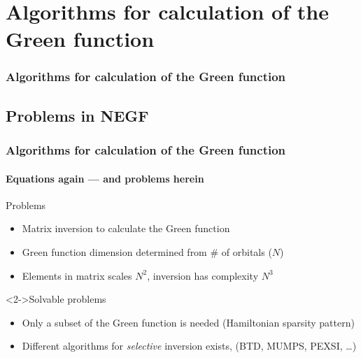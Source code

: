 \section{Algorithms for calculation of the Green function}

\begin{framenologo}
  \frametitle{Algorithms for calculation of the Green function}
  \tableofcontents[currentsection]
\end{framenologo}


\subsection{Problems in NEGF}

\begin{framenologo}
  \frametitle{Algorithms for calculation of the Green function}
  \framesubtitle{Equations again --- and problems herein}
  

  \begin{block}{Problems}
    \begin{itemize}
      \item Matrix inversion to calculate the Green function
      \item Green function dimension determined from \# of orbitals ($N$)
      \item Elements in matrix scales $N^2$, inversion has complexity $N^3$
    \end{itemize}
  \end{block}

  \begin{block}<2->{Solvable problems}
    \begin{itemize}
      \item Only a subset of the Green function is needed (Hamiltonian sparsity pattern)
      \item Different algorithms for \emph{selective} inversion exists, (BTD, MUMPS,
      PEXSI, \dots)
    \end{itemize}
  \end{block}

\end{framenologo}


